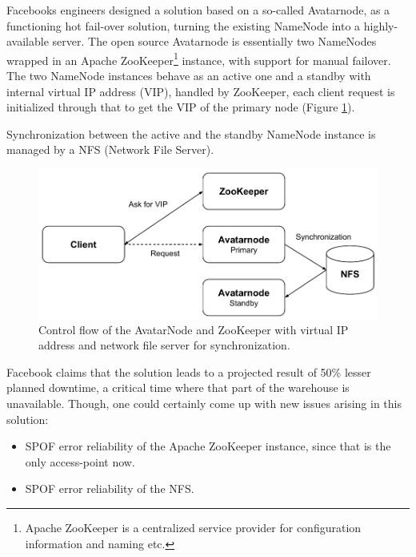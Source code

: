 \newpage
Facebooks engineers designed a solution based on a so-called Avatarnode, as a functioning hot fail-over solution, turning the existing NameNode into a highly-available server. The open source Avatarnode is essentially two NameNodes wrapped in an Apache ZooKeeper\footnote{Apache ZooKeeper\cite{PageZookeper} is a centralized service provider for configuration information and naming etc.} instance, with support for manual failover. The two NameNode instances behave as an active one and a standby with internal virtual IP address (VIP), handled by ZooKeeper, \ie each client request is initialized through that to get the VIP of the primary node (Figure \ref{fig:facebook-avatarnode}).
\newline

Synchronization between the active and the standby NameNode instance is managed by a NFS (Network File Server).
\vspace*{3mm}

\begin{figure}[h!]
	\centering
	\includegraphics[scale=0.8]{pdf/facebook-avatarnode.pdf}
	\caption[Avatarnode: Facebooks Hadoop implementation]{Control flow of the AvatarNode and ZooKeeper with virtual IP address and network file server for synchronization. \label{fig:facebook-avatarnode}}
	\vspace*{3mm}
\end{figure}

Facebook claims that the solution leads to a projected result of 50\% lesser planned downtime, \ie a critical time where that part of the warehouse is unavailable. Though, one could certainly come up with new issues arising in this solution:
\begin{itemize}
	\item SPOF error reliability of the Apache ZooKeeper instance, since that is the only access-point now.
	\item SPOF error reliability of the NFS.
\end{itemize}

